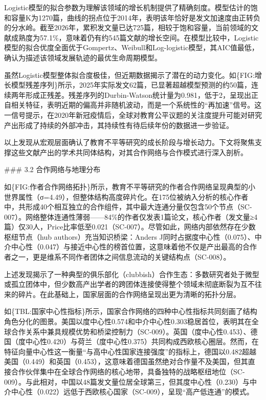 \documentclass[12pt,a4paper]{article}
\begin{document}
Logistic模型的拟合参数为理解该领域的增长机制提供了精确刻度。模型估计的饱和容量K为1270篇，曲线的拐点位于2014年，表明该年恰好是发文加速度由正转负的分水岭。截至2026年，累积发文量已达725篇，相较于饱和容量，当前领域的文献成熟度为57.1\%，意味着仍有约545篇文献的增长空间。在模型比较中，Logistic模型的拟合优度全面优于Gompertz、Weibull和Log-logistic模型，其AIC值最低，确认为描述该领域发展轨迹的最优生命周期模型。

虽然Logistic模型整体拟合度极佳，但近期数据揭示了潜在的动力变化。如\{FIG:增长模型残差序列\}所示，2025年实际发文62篇，已显著超越模型预测的约50篇，连续两年形成正残差。残差序列的Durbin-Watson统计量为0.981，低于2，呈现出正自相关特征，表明近期的偏高并非随机波动，而是一个系统性的“再加速”信号。这一信号提示，在2020年新冠疫情后，全球对教育公平议题的关注度提升可能对研究产出形成了持续的外部冲击，其持续性有待后续年份的数据进一步验证。

以上发现从宏观层面确认了教育不平等研究的成长阶段与增长动力。下文将聚焦支撑这些文献产出的学术共同体结构，对其合作网络与合作模式进行深入剖析。

\#\#\# 3.2 合作网络与地理分布

如\{FIG:作者合作网络拓扑\}所示，教育不平等研究的作者合作网络呈现典型的小世界属性（σ=4.49），但整体结构高度碎片化。在175位被纳入分析的核心作者中，共形成40个相互独立的合作组件，其中最大连通分量仅包含50个节点（SC-007）。网络整体连通性薄弱——84\%的作者仅发表1篇论文，核心作者（发文量≥4篇）仅30人，Price比率低至0.021（SC-007）。尽管如此，网络内部依然存在少数枢纽节点（hub authors）充当知识桥梁：Anders J同时占据度中心性（0.075）、中介中心性（0.047）与接近中心性的榜首位置，这意味着他不仅是产出最高的合作者之一，更是维系不同作者团体之间信息流动的关键结构点（SC-008）。

上述发现揭示了一种典型的俱乐部化（clubbish）合作生态：多数研究者处于微型或孤立团体中，但少数高产出学者的跨团体连接使得整个领域未彻底断裂为互不往来的碎片。在此基础上，国家层面的合作网络呈现出更为清晰的拓扑分层。

如\{TBL:国家中心性指标\}所示，国家合作网络的四种中心性指标共同刻画了结构角色分化的图景。美国以度中心性0.574和中介中心性0.303稳居首位，表明其在全球合作关系中兼具规模优势和桥梁控制力（SC-009）。英国（度中心性0.453）、德国（度中心性0.420）与荷兰（度中心性0.375）共同构成西欧核心圈层。然而，在特征向量中心性这一衡量“与高中心性国家连接强度”的指标上，德国以0.482超越美国（0.449）和英国（0.453），这意味着德国虽然绝对合作量不及美国，但其直接合作伙伴集中在全球合作网络的核心地带，具备独特的战略枢纽地位（SC-009）。与此相对，中国以48篇发文量位居全球第三，但其度中心性（0.230）与中介中心性（0.022）远低于西欧核心国家（SC-009），呈现“高产低连通”的模式。
\end{document}
